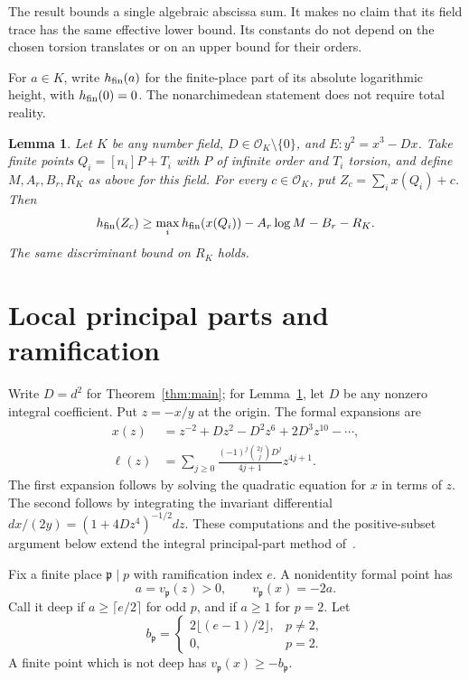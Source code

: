 \documentclass[11pt,a4paper]{article}
\newtheorem{lemma}[theorem]{Lemma}
\begin{document}
The result bounds a single algebraic abscissa sum. It makes no
claim that its field trace has the same effective lower bound.
Its constants do not depend on the chosen torsion translates or
on an upper bound for their orders.

For $a\in K$, write $h_{\rm fin}(a)$ for the finite-place part
of its absolute logarithmic height, with $h_{\rm fin}(0)=0$.
The nonarchimedean statement does not require total reality.

\begin{lemma}\label{lem:finite}
Let $K$ be any number field, $D\in\mathcal O_K\setminus\{0\}$,
and $E:y^2=x^3-Dx$. Take finite points $Q_i=[n_i]P+T_i$
with $P$ of infinite order and $T_i$ torsion, and define
$M,A_r,B_r,R_K$ as above for this field. For every
$c\in\mathcal O_K$, put $Z_c=\sum_i x(Q_i)+c$. Then
\[
 h_{\rm fin}(Z_c)\ge\max_i h_{\rm fin}(x(Q_i))
                    -A_r\log M-B_r-R_K.
\]
The same discriminant bound on $R_K$ holds.
\end{lemma}

\section{Local principal parts and ramification}

Write $D=d^2$ for Theorem~\ref{thm:main}; for
Lemma~\ref{lem:finite}, let $D$ be any nonzero integral coefficient.
Put $z=-x/y$ at the origin. The formal
expansions are
\begin{align}
 x(z)&=z^{-2}+Dz^2-D^2z^6+2D^3z^{10}-\cdots,\label{eq:x}\\
 \ell(z)&=\sum_{j\ge0}
 \frac{(-1)^j\binom{2j}{j}D^j}{4j+1}z^{4j+1}.
 \label{eq:log}
\end{align}
The first expansion follows by solving the quadratic equation for
$x$ in terms of $z$. The second follows by integrating the invariant
differential
$dx/(2y)=(1+4Dz^4)^{-1/2}dz$.
These computations and the positive-subset argument below extend
the integral principal-part method of~\cite{Sums}.

Fix a finite place $\mathfrak p\mid p$ with ramification index $e$.
A nonidentity formal point has
\[
 a=v_\mathfrak p(z)>0,\qquad v_\mathfrak p(x)=-2a.
\]
Call it deep if $a\ge\lceil e/2\rceil$ for odd $p$, and if
$a\ge1$ for $p=2$.
Let
\[
 b_\mathfrak p=\begin{cases}2\lfloor(e-1)/2\rfloor,&p\ne2,\\0,&p=2.\end{cases}
\]
A finite point which is not deep has
$v_\mathfrak p(x)\ge-b_\mathfrak p$.
\end{document}
